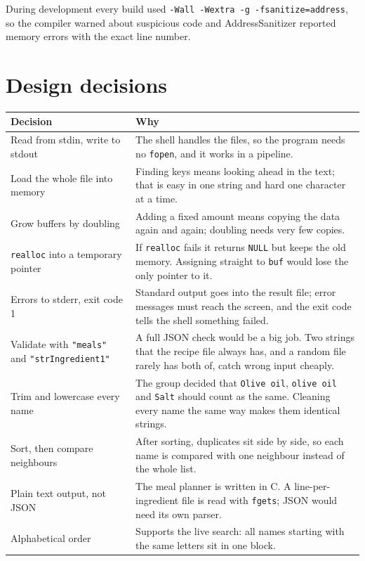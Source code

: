 \documentclass[11pt,a4paper]{article}
\newcommand{\code}[1]{\texttt{#1}}
\begin{document}
During development every build used
\code{-Wall -Wextra -g -fsanitize=address}, so the compiler warned about
suspicious code and AddressSanitizer reported memory errors with the exact line
number.

\section{Design decisions}

\begin{center}
\small
\begin{tabularx}{\textwidth}{@{}>{\raggedright\arraybackslash}p{} L@{}}
\toprule
\textbf{Decision} & \textbf{Why} \\
\midrule
Read from stdin, write to stdout
  & The shell handles the files, so the program needs no \code{fopen}, and it
    works in a pipeline. \\
Load the whole file into memory
  & Finding keys means looking ahead in the text; that is easy in one string
    and hard one character at a time. \\
Grow buffers by doubling
  & Adding a fixed amount means copying the data again and again; doubling
    needs very few copies. \\
\code{realloc} into a temporary pointer
  & If \code{realloc} fails it returns \code{NULL} but keeps the old memory.
    Assigning straight to \code{buf} would lose the only pointer to it. \\
Errors to stderr, exit code 1
  & Standard output goes into the result file; error messages must reach the
    screen, and the exit code tells the shell something failed. \\
Validate with \code{"meals"} and \code{"strIngredient1"}
  & A full JSON check would be a big job. Two strings that the recipe file
    always has, and a random file rarely has both of, catch wrong input
    cheaply. \\
Trim and lowercase every name
  & The group decided that \code{Olive oil}, \code{olive oil} and
    \code{Salt\textvisiblespace} should count as the same. Cleaning every name
    the same way makes them identical strings. \\
Sort, then compare neighbours
  & After sorting, duplicates sit side by side, so each name is compared with
    one neighbour instead of the whole list. \\
Plain text output, not JSON
  & The meal planner is written in C. A line-per-ingredient file is read with
    \code{fgets}; JSON would need its own parser. \\
Alphabetical order
  & Supports the live search: all names starting with the same letters sit in
    one block. \\
\bottomrule
\end{tabularx}
\end{center}
\end{document}
